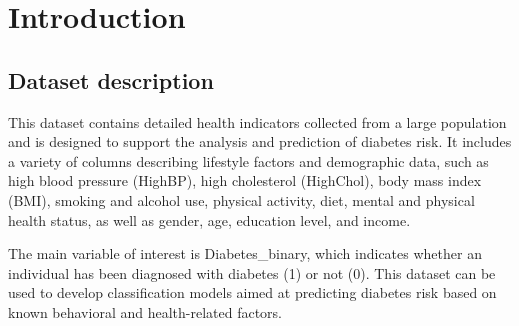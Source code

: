 \newpage
\section{Introduction}
\subsection{Dataset description}
This dataset contains detailed health indicators collected from a large population and is designed to support the analysis and prediction of diabetes risk. It includes a variety of columns describing lifestyle factors and demographic data, such as high blood pressure (HighBP), high cholesterol (HighChol), body mass index (BMI), smoking and alcohol use, physical activity, diet, mental and physical health status, as well as gender, age, education level, and income.

The main variable of interest is Diabetes\_binary, which indicates whether an individual has been diagnosed with diabetes (1) or not (0). This dataset can be used to develop classification models aimed at predicting diabetes risk based on known behavioral and health-related factors.

